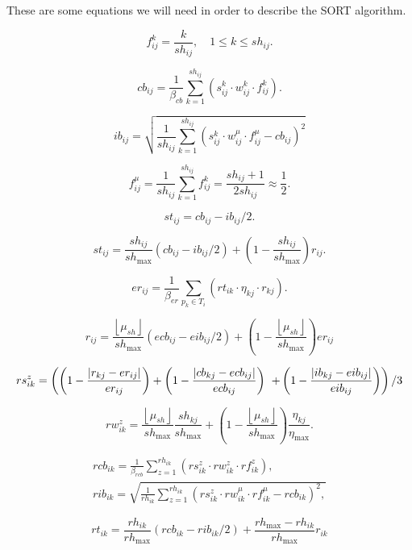 These are some equations we will need in order to describe the SORT algorithm.

$$
f_{i j}^{k}=\frac{k}{s h_{i j}}, \quad 1 \leq k \leq s h_{i j} .
$$


$$
c b_{i j}=\frac{1}{\beta_{c b}} \sum_{k=1}^{s h_{i j}}\left(s_{i j}^{k} \cdot w_{i j}^{k} \cdot f_{i j}^{k}\right) .
$$


$$
i b_{i j}=\sqrt{\frac{1}{s h_{i j}} \sum_{k=1}^{s h_{i j}}\left(s_{i j}^{k} \cdot w_{i j}^{\mu} \cdot f_{i j}^{\mu}-c b_{i j}\right)^{2}}
$$

$$
f_{i j}^{\mu}=\frac{1}{s h_{i j}} \sum_{k=1}^{s h_{i j}} f_{i j}^{k}=\frac{s h_{i j}+1}{2 s h_{i j}} \approx \frac{1}{2} .
$$

$$
s t_{i j}=c b_{i j}-i b_{i j} / 2 .
$$

$$
s t_{i j}=\frac{s h_{i j}}{s h_{\max }}\left(c b_{i j}-i b_{i j} / 2\right)+\left(1-\frac{s h_{i j}}{s h_{\max }}\right) r_{i j} .
$$

$$
e r_{i j}=\frac{1}{\beta_{e r}} \sum_{p_{k} \in T_{i}}\left(r t_{i k} \cdot \eta_{k j} \cdot r_{k j}\right) .
$$

$$
r_{i j}=\frac{\left\lfloor\mu_{s h}\right\rfloor}{s h_{\max }}\left(e c b_{i j}-e i b_{i j} / 2\right)+\left(1-\frac{\left\lfloor\mu_{s h}\right\rfloor}{s h_{\max }}\right) e r_{i j}
$$

$$
r s_{i k}^{z}=\left(\left(1-\frac{\left|r_{k j}-e r_{i j}\right|}{e r_{i j}}\right)+\left(1-\frac{\left|c b_{k j}-e c b_{i j}\right|}{e c b_{i j}}\right)\right. \\
\left.+\left(1-\frac{\left|i b_{k j}-e i b_{i j}\right|}{e i b_{i j}}\right)\right) / 3
$$

$$
r w_{i k}^{z}=\frac{\left\lfloor\mu_{s h}\right\rfloor}{s h_{\max }} \frac{s h_{k j}}{s h_{\max }}+\left(1-\frac{\left\lfloor\mu_{s h}\right\rfloor}{s h_{\max }}\right) \frac{\eta_{k j}}{\eta_{\max }} .
$$

\begin{gather}
    r c b_{i k}=\frac{1}{\beta_{r c b}} \sum_{z=1}^{r h_{i k}}\left(r s_{i k}^{z} \cdot r w_{i k}^{z} \cdot r f_{i k}^{z}\right), \\
    r i b_{i k}=\sqrt{\frac{1}{r h_{i k}} \sum_{z=1}^{r h_{i k}}\left(r s_{i k}^{z} \cdot r w_{i k}^{\mu} \cdot r f_{i k}^{\mu}-r c b_{i k}\right)^{2},}
\end{gather}


$$
r t_{i k}=\frac{r h_{i k}}{r h_{\max }}\left(r c b_{i k}-r i b_{i k} / 2\right)+\frac{r h_{\max }-r h_{i k}}{r h_{\max }} r_{i k}
$$
